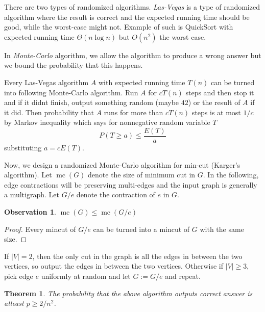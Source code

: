 \documentclass{article}
\theoremstyle{plain}
\newtheorem{thm}{Theorem}
\newtheorem{pozo}{Observation}
\theoremstyle{definition}
\begin{document}
There are two types of randomized algorithms. \textit{Las-Vegas} is a type of randomized algorithm where the result is correct and the expected running time should be good, while the worst-case might not. Example of such is QuickSort with expected running time $\Theta(n\log n)$ but $O(n^2)$ the worst case.

In \textit{Monte-Carlo} algorithm, we allow the algorithm to produce a wrong answer but we bound the probability that this happens.

Every Las-Vegas algorithm $A$ with expected running time $T(n)$ can be turned into following Monte-Carlo algorithm. Run $A$ for $cT(n)$ steps and then stop it and if it didnt finish, output something random (maybe $42$) or the result of $A$ if it did. Then probability that $A$ runs for more than $cT(n)$ steps is at most $1/c$ by Markov inequality which says for nonnegative random variable $T$
$$
P(T\geq a)\leq \frac{E(T)}{a}
$$
substituting $a=cE(T)$.


Now, we design a randomized Monte-Carlo algorithm for min-cut (Karger's algorithm). Let $\operatorname{mc}(G)$ denote the size of minimum cut in $G$. In the following, edge contractions will be preserving multi-edges and the input graph is generally a multigraph. Let $G/e$ denote the contraction of $e$ in $G$.
\begin{pozo}
	$\operatorname{mc}(G)\leq \operatorname{mc}(G/e)$
\end{pozo}
\begin{proof}
	Every mincut of $G/e$ can be turned into a mincut of $G$ with the same size.
\end{proof}

If $|V|=2$, then the only cut in the graph is all the edges in between the two vertices, so output the edges in between the two vertices. Otherwise if $|V|\geq 3$, pick edge $e$ uniformly at random and let $G:=G/e$ and repeat. 

\begin{thm}
	The probability that the above algorithm outputs correct answer is atleast $p\geq 2/n^2$.
\end{thm}
\end{document}
